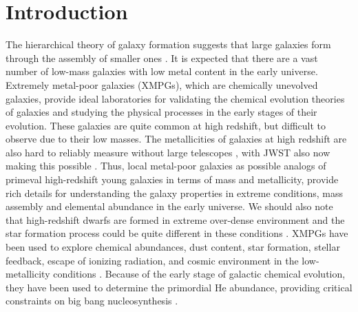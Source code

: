 \documentclass[twocolumn]{aastex631}
\newcommand{\boldtext}[1]{\textcolor[rgb]{0,0,0}{#1}}
\begin{document}
\section{Introduction} \label{sec:intro}
The hierarchical theory of galaxy formation suggests that large galaxies form through the assembly of smaller ones \citep{Whi91,Col00}. It is expected that there are a vast number of low-mass galaxies with low metal content in the early universe. Extremely metal-poor galaxies (XMPGs), which are chemically unevolved galaxies, provide ideal laboratories for validating the chemical evolution theories of galaxies and studying the physical processes in the early stages of their evolution. These galaxies are quite common at high redshift, but difficult to observe due to their low masses. The metallicities of galaxies at high redshift are also hard to reliably measure without large telescopes \citep[e.g.,][]{San16b,Gbu19}, with JWST also now making this possible \citep[e.g.][]{Cur23}. Thus, local metal-poor galaxies as possible analogs of primeval high-redshift young galaxies in terms of mass and metallicity, provide rich details for understanding the galaxy properties in extreme conditions, mass assembly and elemental abundance in the early universe. \boldtext{We should also note that high-redshift dwarfs are formed in extreme over-dense environment and the star formation process could be quite different in these conditions \citep[e.g.,][]{Dek23}.}  XMPGs have been used to explore chemical abundances, dust content, star formation, stellar feedback, escape of ionizing radiation, and cosmic environment in the low-metallicity conditions \citep{Thu99,Her12,Fil15,Sac16,Olm17,Pla19,Xuy22}. Because of the early stage of galactic chemical evolution, they have been used to determine the primordial He abundance, providing critical constraints on big bang nucleosynthesis \citep{Izo04,Hsy20,Mat22}. %
\end{document}

